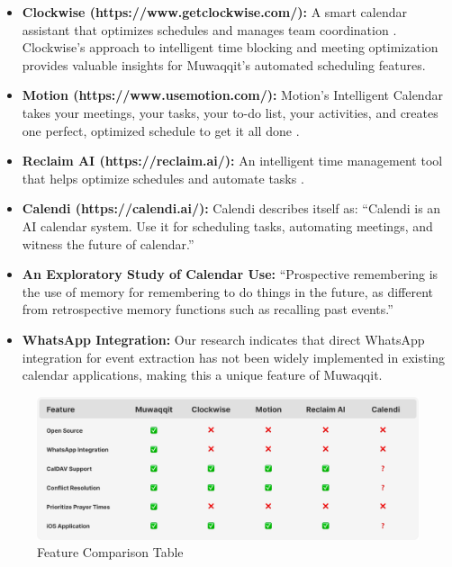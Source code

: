 \documentclass[12pt,a4paper]{article}
\begin{document}
\begin{itemize}
    \item \textbf{Clockwise (https://www.getclockwise.com/):} A smart calendar assistant that optimizes schedules and manages team coordination \cite{clockwise}. Clockwise's approach to intelligent time blocking and meeting optimization provides valuable insights for Muwaqqit's automated scheduling features.
    \item \textbf{Motion (https://www.usemotion.com/):} Motion's Intelligent Calendar takes your meetings, your tasks, your to-do list, your activities, and creates one perfect, optimized schedule to get it all done \cite{motion}.
    \item \textbf{Reclaim AI (https://reclaim.ai/):} An intelligent time management tool that helps optimize schedules and automate tasks \cite{reclaim}.
    \item \textbf{Calendi (https://calendi.ai/):} Calendi describes itself as: ``Calendi is an AI calendar system. Use it for scheduling tasks, automating meetings, and witness the future of calendar.'' \cite{calendi}
    \item \textbf{An Exploratory Study of Calendar Use:} ``Prospective remembering is the use of memory for remembering to do things in the future, as different from retrospective memory functions such as recalling past events.'' \cite{tungare2008exploratorystudycalendaruse}
    \item \textbf{WhatsApp Integration:} Our research indicates that direct WhatsApp integration for event extraction has not been widely implemented in existing calendar applications, making this a unique feature of Muwaqqit.
\end{itemize}

\begin{figure}[!h]
    \centering
    \includegraphics[width=\textwidth]{images/features-table.png}
    \caption{Feature Comparison Table}
    \label{fig:features-table}
\end{figure}
\end{document}

